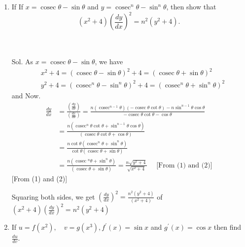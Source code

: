 \begin{enumerate}
\begin{outline}
\end{outline}





\item If
If $x=\operatorname{cosec} \theta-\sin \theta$ and $y=\operatorname{cosec}^n \theta-\sin ^n \theta$, then show that
$$
\left(x^2+4\right)\left(\frac{d y}{d x}\right)^2=n^2\left(y^2+4\right) \text {. }
$$\\\\


\begin{outline}
    Sol. As $x=\operatorname{cosec} \theta-\sin \theta$, we have
$$
\begin{aligned}
& x^2+4=(\operatorname{cosec} \theta-\sin \theta)^2+4=(\operatorname{cosec} \theta+\sin \theta)^2 \\
& y^2+4=\left(\operatorname{cosec}^n \theta-\sin ^n \theta\right)^2+4=\left(\operatorname{cosec}^n \theta+\sin ^n \theta\right)^2
\end{aligned}
$$
and
Now.
$$
\begin{aligned}
\frac{d y}{d x} & =\frac{\left(\frac{d y}{d \theta}\right)}{\left(\frac{d x}{d \theta}\right)}=\frac{n\left(\operatorname{cosec}^{n-1} \theta\right)(-\operatorname{cosec} \theta \cot \theta)-n \sin ^{n-1} \theta \cos \theta}{-\operatorname{cosec} \theta \cot \theta-\cos \theta} \\
& =\frac{n\left(\operatorname{cosec}^n \theta \cot \theta+\sin ^{n-1} \theta \cos \theta\right)}{(\operatorname{cosec} \theta \cot \theta+\cos \theta)} \\
& =\frac{n \cot \theta\left(\operatorname{cosec} ^n \theta+\sin ^n \theta\right)}{\cot \theta(\operatorname{cosec} \theta+\sin \theta)} \\
& =\frac{n\left(\operatorname{cosec}{ }^n \theta+\sin ^n \theta\right)}{(\operatorname{cosec} \theta+\sin \theta)}=\frac{n \sqrt{y^2+4}}{\sqrt{x^2+4}} \quad \text { [From (1) and (2)] }
\end{aligned}
$$
[From (1) and (2)]

Squaring both sides, we get $\left(\frac{d y}{d x}\right)^2=\frac{n^2\left(y^2+4\right)}{\left(x^2+4\right)}$
of $\left(x^2+4\right)\left(\frac{d y}{d x}\right)^2=n^2\left(y^2+4\right)$
\end{outline}


 \item If $u=f\left(x^2\right), \quad v=g\left(x^3\right), f^{\prime}(x)=\sin x$ and $g^{\prime}(x)=\cos x$ then find $\frac{d u}{d v}$.\\\\



\end{enumerate}
